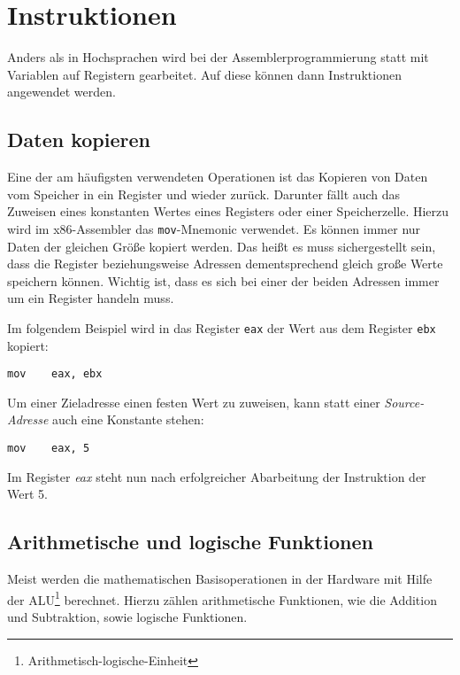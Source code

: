 \section{Instruktionen}

Anders als in Hochsprachen wird bei der Assemblerprogrammierung statt mit Variablen auf Registern gearbeitet. Auf diese können dann Instruktionen angewendet werden.

\subsection{Daten kopieren}
Eine der am häufigsten verwendeten Operationen ist das Kopieren von Daten vom Speicher in ein Register und wieder zurück.
Darunter fällt auch das Zuweisen eines konstanten Wertes eines Registers oder einer Speicherzelle.
Hierzu wird im x86-Assembler das \texttt{mov}-Mnemonic verwendet.
Es können immer nur Daten der gleichen Größe kopiert werden.
Das heißt es muss sichergestellt sein, dass die Register beziehungsweise Adressen dementsprechend gleich große Werte speichern können.
Wichtig ist, dass es sich bei einer der beiden Adressen immer um ein Register handeln muss.

Im folgendem Beispiel wird in das Register \texttt{eax} der Wert aus dem Register \texttt{ebx} kopiert:

\begin{lstlisting}
mov    eax, ebx
\end{lstlisting}

Um einer Zieladresse einen festen Wert zu zuweisen, kann statt einer \textit{Source-Adresse} auch eine Konstante stehen:

\begin{lstlisting}
mov    eax, 5
\end{lstlisting}

Im Register \textit{eax} steht nun nach erfolgreicher Abarbeitung der Instruktion der Wert 5.


\subsection{Arithmetische und logische Funktionen}
Meist werden die mathematischen Basisoperationen in der Hardware mit Hilfe der ALU\footnote{Arithmetisch-logische-Einheit} berechnet.
Hierzu zählen arithmetische Funktionen, wie die Addition und Subtraktion, sowie logische Funktionen.

